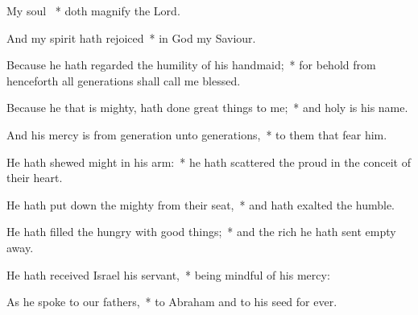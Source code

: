 \begin{enpars}
\item My soul \cc~* doth magnify the Lord.
\item And my spirit hath rejoiced~* in God my Saviour.
\item Because he hath regarded the humility of his handmaid;~* for behold from henceforth all generations shall call me blessed.
\item Because he that is mighty, hath done great things to me;~* and holy is his name.
\item
And his mercy is from generation unto generations,~* to them that fear him.
\item
He hath shewed might in his arm:~* he hath scattered the proud in the conceit of their heart.
\item
He hath put down the mighty from their seat,~* and hath exalted the humble.
\item
He hath filled the hungry with good things;~* and the rich he hath sent empty away.
\item
He hath received Israel his servant,~* being mindful of his mercy:
\item
As he spoke to our fathers,~* to Abraham and to his seed for ever.
\end{enpars}